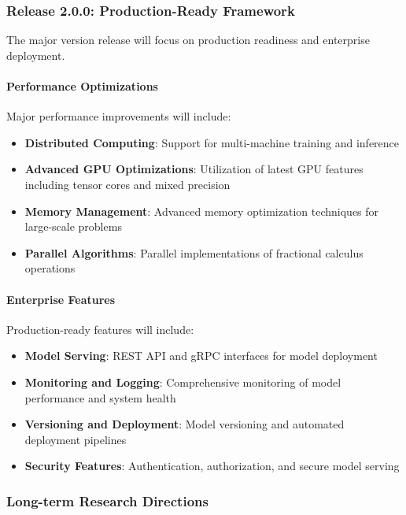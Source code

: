 \subsubsection{Release 2.0.0: Production-Ready Framework}

The major version release will focus on production readiness and enterprise deployment.

\paragraph{Performance Optimizations}
Major performance improvements will include:

\begin{itemize}
    \item \textbf{Distributed Computing}: Support for multi-machine training and inference
    \item \textbf{Advanced GPU Optimizations}: Utilization of latest GPU features including tensor cores and mixed precision
    \item \textbf{Memory Management}: Advanced memory optimization techniques for large-scale problems
    \item \textbf{Parallel Algorithms}: Parallel implementations of fractional calculus operations
\end{itemize}

\paragraph{Enterprise Features}
Production-ready features will include:

\begin{itemize}
    \item \textbf{Model Serving}: REST API and gRPC interfaces for model deployment
    \item \textbf{Monitoring and Logging}: Comprehensive monitoring of model performance and system health
    \item \textbf{Versioning and Deployment}: Model versioning and automated deployment pipelines
    \item \textbf{Security Features}: Authentication, authorization, and secure model serving
\end{itemize}

\subsubsection{Long-term Research Directions}

